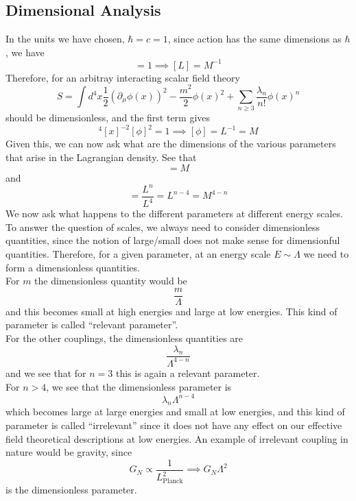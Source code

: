 \documentclass[11pt]{article}
\newcommand{\del}{\partial}
\numberwithin{equation}{section}
\begin{document}
\subsection{Dimensional Analysis}
\label{sec:dimensionalanalysis}
In the units we have chosen, \(\hbar = c = 1\), since action has the same dimensions as \(\hbar\), we have 
\begin{equation*}
    [S] = 1 \implies [L] = M^{-1}
\end{equation*}
Therefore, for an arbitray interacting scalar field theory 
\begin{equation*}
    S = \int d^4x \frac{1}{2}(\del_\mu \phi(x))^2 - \frac{m^2}{2}\phi(x)^2 + \sum_{n\ge 3}\frac{\lambda_n}{n!}\phi(x)^n
\end{equation*}
should be dimensionless, and the first term gives
\begin{equation*}
    [x]^4[x]^{-2}[\phi]^2 = 1 \implies [\phi]= L^{-1} = M
\end{equation*}
Given this, we can now ask what are the dimensions of the various parameters that arise in the Lagrangian density. See that 
\begin{equation*}
    [m] = M
\end{equation*}
and
\begin{equation*}
    [\lambda_n] = \frac{L^n}{L^4} = L^{n-4} = M^{4-n}
\end{equation*}
We now ask what happens to the different parameters at different energy scales. To answer the question of scales, we always need to consider dimensionless quantities, since the notion of large/small does not make sense for dimensionful quantities. Therefore, for a given parameter, at an energy scale \(E\sim \Lambda\) we need to form a dimensionless quantities. \\

For \(m\) the dimensionless quantity would be 
\begin{equation*}
    \frac{m}{\Lambda}
\end{equation*}
and this becomes small at high energies and large at low energies. This kind of parameter is called ``relevant parameter''. \\
For the other couplings, the dimensionless quantities are 
\begin{equation*}
    \frac{\lambda_n}{\Lambda^{4-n}}
\end{equation*}
and we see that for \(n=3\) this is again a relevant parameter. \\
For \(n>4\), we see that the dimensionless parameter is 
\begin{equation*}
    \lambda_n \Lambda^{n-4}
\end{equation*}
which becomes large at large energies and small at low energies, and this kind of parameter is called ``irrelevant'' since it does not have any effect on our effective field theoretical descriptions at low energies. An example of irrelevant coupling in nature would be gravity, since 
\begin{equation*}
    G_N \propto \frac{1}{L_{\text{Planck}}^2} \implies G_N\Lambda^2
\end{equation*} is the dimensionless parameter. \\
\end{document}
